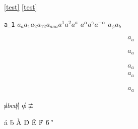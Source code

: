 \documentclass{ctexbook}
\begin{document}
\label{test}
\ref{test}
\eqref{test}

\verb|a_1|
\(a_a a_1 a_2 a_{12} a_{aaa} a^1 a^2 a^a \)
\(a^\alpha a^\gamma a^{-\alpha}\)
\(a_\phi a_b\)

\begin{equation}\label{equ:1}
  a_a
\end{equation}

\begin{align}
  a_a
\end{align}

\begin{equation}
  \begin{aligned}
    a_a
  \end{aligned}
\end{equation}
\begin{gather}
  a_a
\end{gather}

\begin{align*}
  a_a
\end{align*}

\(\not abcd \not |\)
\(\not \alpha \not\equiv \)

\'a \"b \`A \^D \~E \.F \`6 \'\alpha \.\beta
\end{document}
